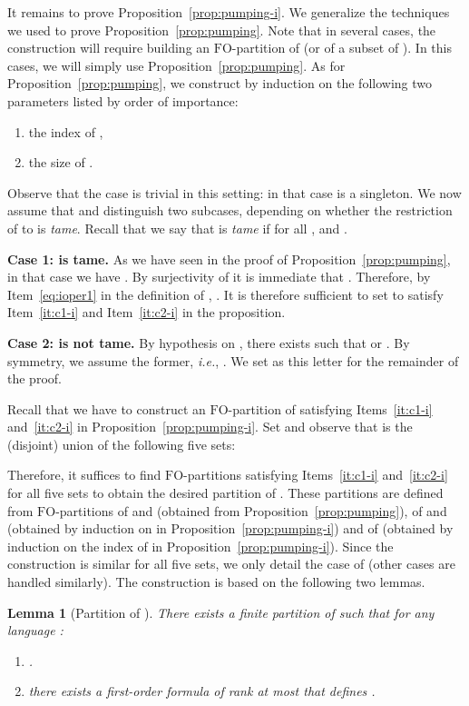 \documentclass{CSML}
\newcommand{\fo}{\ensuremath{\text{FO}}\xspace}
\theoremstyle{plain}
\newtheorem{lemma}[thm]{Lemma}
\begin{document}
It remains to prove Proposition~\ref{prop:pumping-i}. We generalize
the techniques we used to prove Proposition~\ref{prop:pumping}. Note
that in several cases, the construction will require building an
\fo-partition of  (or of a subset of ). In this cases, we
will simply use Proposition~\ref{prop:pumping}. As for
Proposition~\ref{prop:pumping}, we construct  by induction on
the following two parameters listed by order of importance:
\begin{enumerate}[label=]
\item the index  of ,
\item the size of .
\end{enumerate}

Observe that the case  is trivial in this setting: in that
case  is a singleton. We now assume that 
and distinguish two subcases, depending on whether the restriction of
 to  is \emph{tame}. Recall that we say that  is
\emph{tame} if for all ,  and  .

\medskip
\noindent
{\bf Case 1:  is tame.} As we have seen in the proof of
Proposition~\ref{prop:pumping}, in that case we have . By surjectivity of  it is immediate that
. Therefore, by Item~\ref{eq:ioper1}
in the definition of , . It is therefore sufficient to set  to satisfy Item~\ref{it:c1-i} and Item~\ref{it:c2-i}
in the proposition.

\medskip
\noindent
{\bf Case 2:   is not tame.}  By
hypothesis on , there exists  such that  or . By symmetry, we assume the former,
\emph{i.e.}, . We
set  as this letter for the remainder of the proof.

Recall that we have to construct an \fo-partition  of 
satisfying Items~\ref{it:c1-i} and~\ref{it:c2-i} in
Proposition~\ref{prop:pumping-i}. Set  and
observe that  is the (disjoint) union of the following five
sets:

Therefore, it suffices to find \fo-partitions satisfying
Items~\ref{it:c1-i} and~\ref{it:c2-i} for all five sets to obtain
the desired partition of . These partitions are defined from
\fo-partitions of  and  (obtained from
Proposition~\ref{prop:pumping}), of  and 
(obtained by induction on  in Proposition~\ref{prop:pumping-i})
and of  (obtained by induction on the index of
 in Proposition~\ref{prop:pumping-i}). Since the construction
is similar for all five sets, we only detail the case of
 (other cases are handled similarly). The
construction is based on the following two lemmas.

\begin{lemma}[Partition of ] \label{lem:partcp}
There exists a finite partition  of  such that for any
language :
\begin{enumerate}
\item .
\item there exists a first-order formula of
  rank at most  that defines .
\end{enumerate}
\end{lemma}
\end{document}
